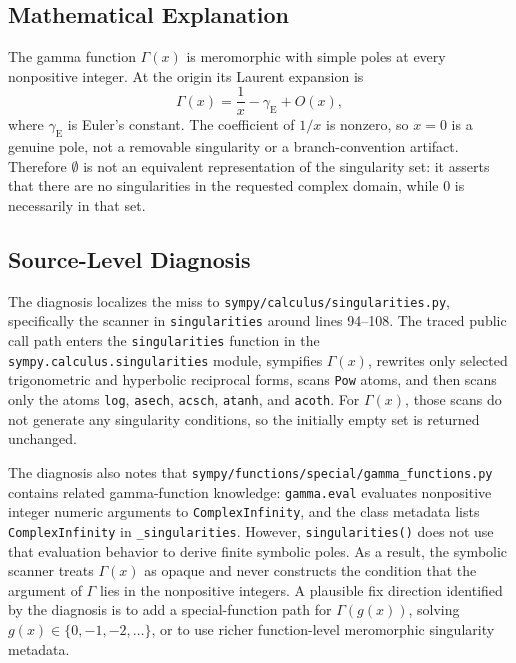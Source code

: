 \documentclass[11pt]{article}
\begin{document}
\subsection{Mathematical Explanation}

The gamma function \(\Gamma(x)\) is meromorphic with simple poles at every nonpositive integer. At the origin its Laurent expansion is
\[
  \Gamma(x) = \frac{1}{x} - \gamma_{\mathrm{E}} + O(x),
\]
where \(\gamma_{\mathrm{E}}\) is Euler's constant. The coefficient of \(1/x\) is nonzero, so \(x=0\) is a genuine pole, not a removable singularity or a branch-convention artifact. Therefore \(\emptyset\) is not an equivalent representation of the singularity set: it asserts that there are no singularities in the requested complex domain, while \(0\) is necessarily in that set.

\subsection{Source-Level Diagnosis}

The diagnosis localizes the miss to \nolinkurl{sympy/calculus/singularities.py}, specifically the scanner in \texttt{singularities} around lines 94--108. The traced public call path enters the \texttt{singularities} function in the \nolinkurl{sympy.calculus.singularities} module, sympifies \(\Gamma(x)\), rewrites only selected trigonometric and hyperbolic reciprocal forms, scans \texttt{Pow} atoms, and then scans only the atoms \texttt{log}, \texttt{asech}, \texttt{acsch}, \texttt{atanh}, and \texttt{acoth}. For \(\Gamma(x)\), those scans do not generate any singularity conditions, so the initially empty set is returned unchanged.

The diagnosis also notes that \nolinkurl{sympy/functions/special/gamma_functions.py} contains related gamma-function knowledge: \texttt{gamma.eval} evaluates nonpositive integer numeric arguments to \texttt{ComplexInfinity}, and the class metadata lists \texttt{ComplexInfinity} in \texttt{\_singularities}. However, \texttt{singularities()} does not use that evaluation behavior to derive finite symbolic poles. As a result, the symbolic scanner treats \(\Gamma(x)\) as opaque and never constructs the condition that the argument of \(\Gamma\) lies in the nonpositive integers. A plausible fix direction identified by the diagnosis is to add a special-function path for \(\Gamma(g(x))\), solving \(g(x)\in\{0,-1,-2,\ldots\}\), or to use richer function-level meromorphic singularity metadata.
\end{document}

